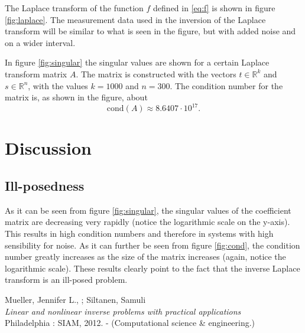 \documentclass[12pt,a4]{article}
\newcommand{\R}{{\mathbb R}}
\begin{document}
The Laplace transform of the function $f$ defined in \eqref{eq:f} is shown in figure \ref{fig:laplace}. The measurement data used in the inversion of the Laplace transform will be similar to what is seen in the figure, but with added noise and on a wider interval.

In figure \ref{fig:singular} the singular values are shown for a certain Laplace transform matrix $A$. The matrix is constructed with the vectors $t \in \R^k$ and $s \in \R^n$, with the values $k = 1000$ and $n = 300$. The condition number for the matrix is, as shown in the figure, about
\begin{equation}
\text{cond}(A) \approx 8.6407 \cdot 10^{17}.
\end{equation}





\section{Discussion}

\subsection{Ill-posedness}

As it can be seen from figure \ref{fig:singular}, the singular values of the coefficient matrix are decreasing very rapidly (notice the logarithmic scale on the y-axis). This results in high condition numbers and therefore in systems with high sensibility for noise. As it can further be seen from figure \ref{fig:cond}, the condition number greatly increases as the size of the matrix increases (again, notice the logarithmic scale). These results clearly point to the fact that the inverse Laplace transform is an ill-posed problem.


\newpage
\begin{thebibliography}{9}

Mueller, Jennifer L., ; Siltanen, Samuli \\
\emph{Linear and nonlinear inverse problems with practical applications} \\ Philadelphia : SIAM, 2012. - (Computational science \& engineering.)

\end{thebibliography}
\end{document}
